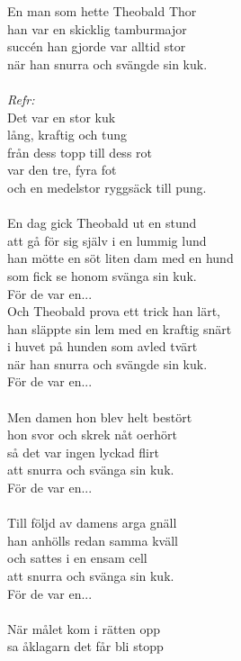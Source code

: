 \vspace{10pt}
En man som hette Theobald Thor\\
han var en skicklig tamburmajor\\
succén han gjorde var alltid stor\\
när han snurra och svängde sin kuk.\\
\\
\emph{Refr:}\\
Det var en stor kuk\\
lång, kraftig och tung\\
från dess topp till dess rot\\
var den tre, fyra fot\\
och en medelstor ryggsäck till pung.\\
\\
En dag gick Theobald ut en stund\\
att gå för sig själv i en lummig lund\\
han mötte en söt liten dam med en hund\\
som fick se honom svänga sin kuk.\\
För de var en...
\\
Och Theobald prova ett trick han lärt,\\
han släppte sin lem med en kraftig snärt\\
i huvet på hunden som avled tvärt\\
när han snurra och svängde sin kuk.\\
För de var en...\\
\\
Men damen hon blev helt bestört\\
hon svor och skrek nåt oerhört\\
så det var ingen lyckad flirt\\
att snurra och svänga sin kuk.\\
För de var en...\\
\\
Till följd av damens arga gnäll\\
han anhölls redan samma kväll\\
och sattes i en ensam cell\\
att snurra och svänga sin kuk.\\
För de var en...\\
\\
När målet kom i rätten opp\\
sa åklagarn det får bli stopp\\
